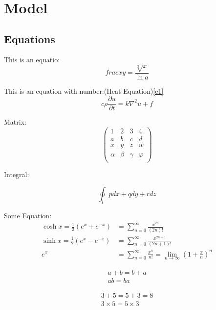 \documentclass[12pt]{article}  %
\begin{document}
\section{Model}
\lipsum[1-4]

\subsection{Equations}

This is an equatio:$$frac{x}{y}=\frac{\sqrt[3]{x}}{\ln a}$$

This is an equation with number:(Heat Equation)\ref{e1}
\begin{equation}\label{e1}
    c\rho\frac{\partial u}{\partial t}=k\nabla^2u+f
\end{equation}

Matrix:
\begin{equation*}
    \left( \begin{matrix}\label{e2}
        1      & 2     & 3      & 4       \\
        a      & b     & c      & d       \\
        x      & y     & z      & w       \\
        \alpha & \beta & \gamma & \varphi \\
    \end{matrix} \right)
\end{equation*}


Integral:

$$
    \oint_l{pdx+qdy+rdz}
$$

Some Equation:
\begin{align}
    \cosh x = \frac {1}{2} (e^x + e^{-x}) & = \sum_{n = 0}^{\infty} \frac {x^{2n}}{(2n)!}                                                \\
    \sinh x = \frac {1}{2} (e^x - e^{-x}) & = \sum_{n = 0}^{\infty} \frac {x^{2n + 1}}{(2n + 1)!}                                        \\
    e^x                                   & = \sum_{n = 0}^{\infty} \frac {x^n}{n!} = \lim_{n\to\infty} \left (1+\frac{x}{n} \right )^n 
\end{align}

\begin{gather}
    a + b = b + a \\
    ab = ba
\end{gather}

\begin{gather*}
    3 + 5 = 5 + 3 = 8 \\
    3 \times 5 = 5 \times 3
\end{gather*}
\end{document}
